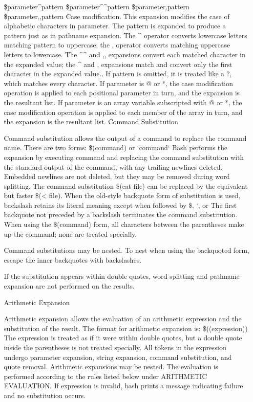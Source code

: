 {{{\${parameter\^{}pattern}
\${parameter\^{}\^{}pattern}
\${parameter,pattern}
\${parameter,,pattern}
Case modification. This expansion modifies the case of alphabetic characters in parameter. The pattern is expanded to produce a pattern just as in pathname expansion. The \^{} operator converts lowercase letters matching pattern to uppercase; the , operator converts matching uppercase letters to lowercase. The \^{}\^{} and ,, expansions convert each matched character in the expanded value; the \^{} and , expansions match and convert only the first character in the expanded value.. If pattern is omitted, it is treated like a ?, which matches every character. If parameter is @ or *, the case modification operation is applied to each positional parameter in turn, and the expansion is the resultant list. If parameter is an array variable subscripted with @ or *, the case modification operation is applied to each member of the array in turn, and the expansion is the resultant list.
Command Substitution

Command substitution allows the output of a command to replace the command name. There are two forms:
\$(command)
or
`command`
Bash performs the expansion by executing command and replacing the command substitution with the standard output of the command, with any trailing newlines deleted. Embedded newlines are not deleted, but they may be removed during word splitting. The command substitution \$(cat file) can be replaced by the equivalent but faster \$(< file).
When the old-style backquote form of substitution is used, backslash retains its literal meaning except when followed by \$, `, or \. The first backquote not preceded by a backslash terminates the command substitution. When using the \$(command) form, all characters between the parentheses make up the command; none are treated specially.

Command substitutions may be nested. To nest when using the backquoted form, escape the inner backquotes with backslashes.

If the substitution appears within double quotes, word splitting and pathname expansion are not performed on the results.

Arithmetic Expansion

Arithmetic expansion allows the evaluation of an arithmetic expression and the substitution of the result. The format for arithmetic expansion is:
\$((expression))
The expression is treated as if it were within double quotes, but a double quote inside the parentheses is not treated specially. All tokens in the expression undergo parameter expansion, string expansion, command substitution, and quote removal. Arithmetic expansions may be nested.
The evaluation is performed according to the rules listed below under ARITHMETIC EVALUATION. If expression is invalid, bash prints a message indicating failure and no substitution occurs.

}}}
